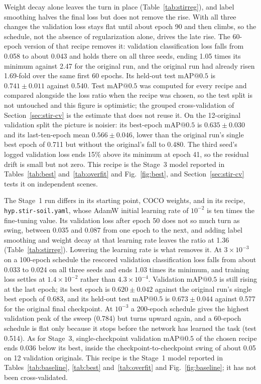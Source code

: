 ﻿\documentclass[journal]{IEEEtran}
\begin{document}
Weight decay alone leaves the turn in place (Table~\ref{tab:stirreg}), and label smoothing halves the final loss but does not remove the rise. With all three changes the validation loss stays flat until about epoch 90 and then climbs, so the schedule, not the absence of regularization alone, drives the late rise. The 60-epoch version of that recipe removes it: validation classification loss falls from 0.058 to about 0.043 and holds there on all three seeds, ending 1.05 times its minimum against 2.47 for the original run, and the original run had already risen 1.69-fold over the same first 60 epochs. Its held-out test $\text{mAP@0.5}$ is $0.741 \pm 0.011$ against 0.540. Test $\text{mAP@0.5}$ was computed for every recipe and compared alongside the loss ratio when the recipe was chosen, so the test split is not untouched and this figure is optimistic; the grouped cross-validation of Section~\ref{sec:stir-cv} is the estimate that does not reuse it. On the 12-original validation split the picture is noisier: its best-epoch $\text{mAP@0.5}$ is $0.635 \pm 0.030$ and its last-ten-epoch mean $0.566 \pm 0.046$, lower than the original run's single best epoch of 0.711 but without the original's fall to 0.480. The third seed's logged validation loss ends 15\% above its minimum at epoch 41, so the residual drift is small but not zero. This recipe is the Stage~3 model reported in Tables~\ref{tab:best} and~\ref{tab:overfit} and Fig.~\ref{fig:best}, and Section~\ref{sec:stir-cv} tests it on independent scenes.

The Stage~1 run differs in its starting point, COCO weights, and in its recipe, \texttt{hyp.stir-soil.yaml}, whose AdamW initial learning rate of $10^{-2}$ is ten times the fine-tuning value. Its validation loss after epoch 50 does not so much turn as swing, between 0.035 and 0.087 from one epoch to the next, and adding label smoothing and weight decay at that learning rate leaves the ratio at 1.36 (Table~\ref{tab:stirreg}). Lowering the learning rate is what removes it. At $3 \times 10^{-3}$ on a 100-epoch schedule the rescored validation classification loss falls from about 0.033 to 0.024 on all three seeds and ends 1.03 times its minimum, and training loss settles at $1.4 \times 10^{-2}$ rather than $4.3 \times 10^{-4}$. Validation $\text{mAP@0.5}$ is still rising at the last epoch; its best epoch is $0.620 \pm 0.042$ against the original run's single best epoch of 0.683, and its held-out test $\text{mAP@0.5}$ is $0.673 \pm 0.044$ against 0.577 for the original final checkpoint. At $10^{-3}$ a 200-epoch schedule gives the highest validation peak of the sweep (0.784) but turns upward again, and a 60-epoch schedule is flat only because it stops before the network has learned the task (test 0.514). As for Stage~3, single-checkpoint validation $\text{mAP@0.5}$ of the chosen recipe ends 0.036 below its best, inside the checkpoint-to-checkpoint swing of about 0.05 on 12 validation originals. This recipe is the Stage~1 model reported in Tables~\ref{tab:baseline}, \ref{tab:best} and~\ref{tab:overfit} and Fig.~\ref{fig:baseline}; it has not been cross-validated.
\end{document}

